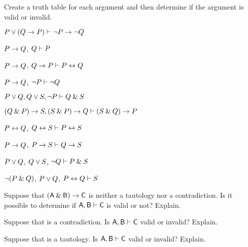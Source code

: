 \begin{small}
\problempart
\label{pr.TT.valid}
Create a truth table for each argument and then determine if the argument is valid or invalid.
\begin{earg}
\item $P\vee(Q\rightarrow P) \vdash {\neg} P \rightarrow {\neg} Q$\vspace{.5ex} %
\item $P\rightarrow Q$, $Q \vdash  P$\vspace{.5ex} %
\item $P \rightarrow Q$, $Q \rightarrow P\vdash P \leftrightarrow Q$\vspace{.5ex} %
\item $P \rightarrow Q$, ${\neg} P\vdash {\neg} Q$ \vspace{.5ex}%

\item $P\vee Q, Q\vee S, {\neg} P \vdash Q \mathbin{\&} S$\vspace{.5ex} %
\item $(Q\mathbin{\&} P)\rightarrow S, (S\mathbin{\&} P)\rightarrow Q \vdash (S\mathbin{\&} Q)\rightarrow P$\vspace{.5ex} %
\item $P\leftrightarrow Q$, $Q\leftrightarrow S \vdash P\leftrightarrow S$\vspace{.5ex} %
\item $P \rightarrow Q$, $P \rightarrow S\vdash Q \rightarrow S$\vspace{.5ex} %

\item $P\vee Q$, $Q\vee S$, ${\neg} Q \vdash P \mathbin{\&} S$\vspace{.5ex} %

\item ${\neg}(P \mathbin{\&} Q)$, $P \vee Q$, $P \leftrightarrow Q\vdash S$ \vspace{.5ex}%
\end{earg}


\problempart
\begin{earg}
\item Suppose that $(\mathsf{A}\mathbin{\&}\mathsf{B})\rightarrow\mathsf{C}$ is neither a tautology nor a contradiction. Is it possible to determine if $\mathsf{A}, \mathsf{B} \vdash \mathsf{C}$ is valid or not? Explain.
\item Suppose that  is a contradiction. Is $\mathsf{A}, \mathsf{B} \vdash \mathsf{C}$ valid or invalid? Explain.
\item Suppose that  is a tautology. Is $\mathsf{A}, \mathsf{B}\vdash \mathsf{C}$ valid or invalid? Explain.
\end{earg}



\end{small}
